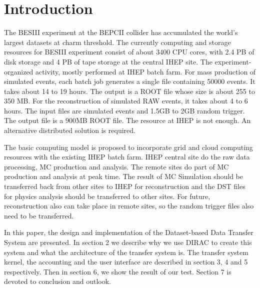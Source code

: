 \section{Introduction}
The BESIII experiment at the BEPCII collider has accumulated
the world's largest datasets at charm threshold.
%
The currently computing and storage resources for BESIII 
experiment consist of about 3400 CPU cores, with 2.4 PB of disk
storage and 4 PB of tape storage at the central IHEP site.
The experiment-organized activity, mostly performed at IHEP
batch farm. For mass production of simulated events,
each batch job generates a single file containing
50000 events. It takes about 14 to 19 hours. The output
is a ROOT file whose size is about 255 to 350 MB.
For the reconstruction of simulated RAW events,
it takes about 4 to 6 hours. The input files are
simulated events and 1.5GB to 2GB random trigger.
The output file is a 900MB ROOT file.
The resource at IHEP is not enough.
An alternative distributed solution is required.

The basic computing model is proposed to incorporate grid and
cloud computing resources with the existing IHEP batch farm.
IHEP central site do the raw data processing, MC production
and analysis. The remote sites do part of MC production
and analysis at peak time.
The result of MC Simulation should be transferred back
from other sites to IHEP for reconstruction
and the DST files for physics analysis should be transferred
to other sites. For future, reconstruction also can take place 
in remote sites, so the random trigger files also need to be 
transferred.

In this paper, the design and implementation of 
the Dataset-based Data Transfer System are presented.
In section 2 we describe why we use DIRAC to create this system
and what the architecture of the transfer system is.
The transfer system kernel, the accounting and the user interface
are described in section 3, 4 and 5 respectively.
Then in section 6, we show the result of our test.
Section 7 is devoted to conclusion and outlook.

